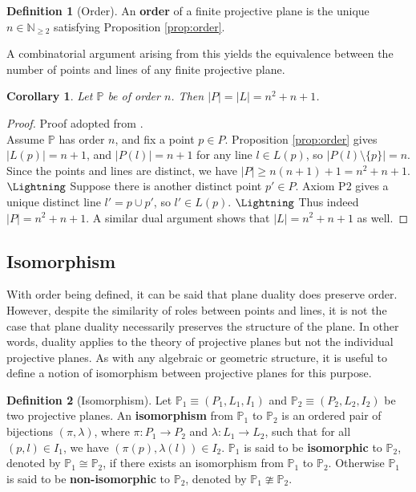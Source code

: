 \documentclass{report}
\newcommand{\N}{\mathbb{N}}
\renewcommand{\P}{\mathbb{P}}
\newtheorem{corollary}[theorem]{Corollary}
\theoremstyle{definition}\newtheorem*{definition}{Definition}
\theoremstyle{definition}\newtheorem*{example}{Example}
\theoremstyle{remark}\newtheorem*{remark}{Remark}
\begin{document}
\begin{definition}[Order]
An \textbf{order} of a finite projective plane is the unique $ n \in \N_{\ge 2} $ satisfying Proposition \ref{prop:order}.
\end{definition}

A combinatorial argument arising from this yields the equivalence between the number of points and lines of any finite projective plane.

\begin{corollary}
\label{cor:ordernn1}
Let $ \P $ be of order $ n $. Then $ |P| = |L| = n^2 + n + 1 $.
\end{corollary}

\begin{proof}
Proof adopted from \cite{pointslines}. \\
Assume $ \P $ has order $ n $, and fix a point $ p \in P $. Proposition \ref{prop:order} gives $ |L(p)| = n + 1 $, and $ |P(l)| = n + 1 $ for any line $ l \in L(p) $, so $ |P(l) \setminus \{ p \}| = n $. Since the points and lines are distinct, we have $ |P| \ge n (n + 1) + 1 = n^2 + n + 1 $. $ \text{\Lightning} $ Suppose there is another distinct point $ p' \in P $. Axiom P2 gives a unique distinct line $ l' = p \cup p' $, so $ l' \in L(p) $. $ \text{\Lightning} $ Thus indeed $ |P| = n^2 + n + 1 $. A similar dual argument shows that $ |L| = n^2 + n + 1 $ as well.
\end{proof}

\subsection{Isomorphism}

With order being defined, it can be said that plane duality does preserve order. However, despite the similarity of roles between points and lines, it is not the case that plane duality necessarily preserves the structure of the plane. In other words, duality applies to the theory of projective planes but not the individual projective planes. As with any algebraic or geometric structure, it is useful to define a notion of isomorphism between projective planes for this purpose.

\begin{definition}[Isomorphism]
Let $ \P_1 \equiv (P_1, L_1, I_1) $ and $ \P_2 \equiv (P_2, L_2, I_2) $ be two projective planes. An \textbf{isomorphism} from $ \P_1 $ to $ \P_2 $ is an ordered pair of bijections $ (\pi, \lambda) $, where $ \pi : P_1 \to P_2 $ and $ \lambda : L_1 \to L_2 $, such that for all $ (p, l) \in I_1 $, we have $ (\pi(p), \lambda(l)) \in I_2 $. $ \P_1 $ is said to be \textbf{isomorphic} to $ \P_2 $, denoted by $ \P_1 \cong \P_2 $, if there exists an isomorphism from $ \P_1 $ to $ \P_2 $. Otherwise $ \P_1 $ is said to be \textbf{non-isomorphic} to $ \P_2 $, denoted by $ \P_1 \ncong \P_2 $.
\end{definition}
\end{document}
